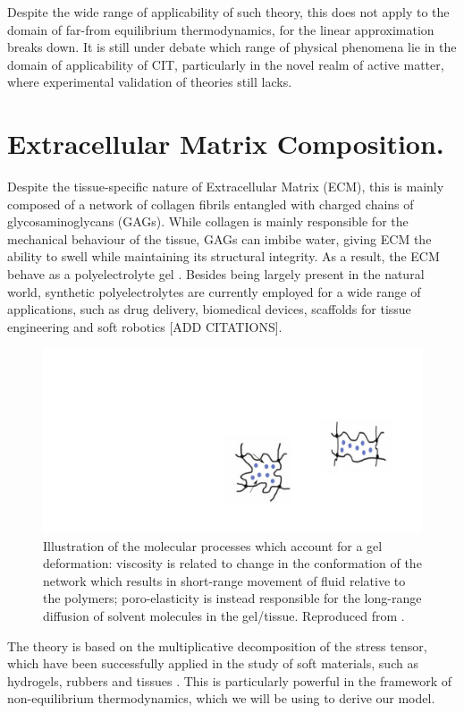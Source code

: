 \documentclass[12pt]{extarticle}
\begin{document}
Despite the wide range of applicability of such theory, this does not apply to the domain of far-from equilibrium thermodynamics, for the linear approximation breaks down. It is still under debate which range of physical phenomena lie in the domain of applicability of CIT, particularly in the novel realm of active matter, where experimental validation of theories still lacks.
\section{Extracellular Matrix Composition.}  
Despite the tissue-specific nature of Extracellular Matrix (ECM), this is mainly composed of a network of collagen fibrils entangled with charged chains of glycosaminoglycans (GAGs). While collagen is mainly responsible for the mechanical behaviour of the tissue, GAGs can imbibe water, giving ECM the ability to swell while maintaining its structural integrity. As a result, the ECM behave as a polyelectrolyte gel \cite{ecm,ecm2}. Besides being largely present in the natural world, synthetic polyelectrolytes are currently employed for a wide range of applications, such as drug delivery, biomedical devices, scaffolds for tissue engineering and soft robotics [ADD CITATIONS].  
\newpage
\begin{figure}
	\centering
\includegraphics[scale=0.325]{images/visco_poro}
\caption{Illustration of the molecular processes which account for a gel deformation: viscosity is related to change in the conformation of the network which results in short-range movement of fluid relative to the polymers; poro-elasticity is instead responsible for the long-range diffusion of solvent molecules in the gel/tissue. Reproduced from \cite{viscoporo}.}
\end{figure}
The theory is based on the multiplicative decomposition of the stress tensor, which have been successfully applied in the study of soft materials, such as hydrogels, rubbers and tissues \cite{Article1, multdec,vol,magneto}. This is particularly powerful in the framework of non-equilibrium thermodynamics, which we will be using to derive our model. 
\end{document}
